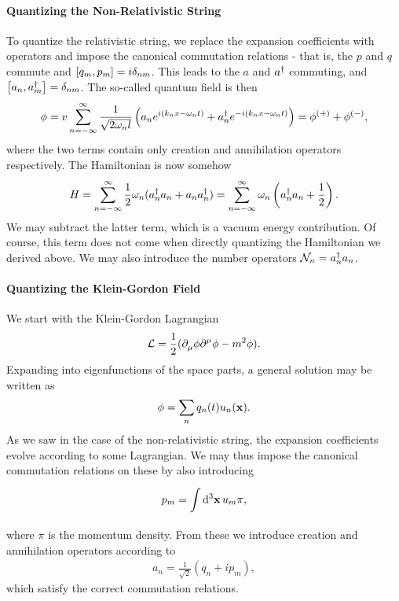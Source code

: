 \paragraph{Quantizing the Non-Relativistic String}
To quantize the relativistic string, we replace the expansion coefficients with operators and impose the canonical commutation relations - that is, the $p$ and $q$ commute and $\comm{q_{m}}{p_{m}} = i\delta_{nm}$. This leads to the $a$ and $a^{\dagger}$ commuting, and $\comm{a_{n}}{a_{m}\adj} = \delta_{nm}$. The so-called quantum field is then
\begin{align*}
	\phi = v\sum\limits_{n = -\infty}^{\infty}\frac{1}{\sqrt{2\omega_{n}l}}\left(a_{n}e^{i(k_{n}x - \omega_{n}t)} + a_{n}^{\dagger} e^{-i(k_{n}x - \omega_{n}t)}\right) = \phi^{(+)} + \phi^{(-)},
\end{align*}
where the two terms contain only creation and annihilation operators respectively. The Hamiltonian is now somehow
\begin{align*}
	H = \sum\limits_{n = -\infty}^{\infty}\frac{1}{2}\omega_{n}(a_{n}^{\dagger} a_{n} + a_{n}a_{n}^{\dagger}) = \sum\limits_{n = -\infty}^{\infty}\omega_{n}\left(a_{n}^{\dagger} a_{n} + \frac{1}{2}\right).
\end{align*}
We may subtract the latter term, which is a vacuum energy contribution. Of course, this term does not come when directly quantizing the Hamiltonian we derived above. We may also introduce the number operators $\mathcal{N}_{n} = a_{n}^{\dagger} a_{n}$.

\paragraph{Quantizing the Klein-Gordon Field}
We start with the Klein-Gordon Lagrangian
\begin{align*}
	\mathcal{L} = \frac{1}{2}(\partial^{}_{\mu}{\phi}\partial^{\mu}_{}{\phi} - m^{2}\phi).
\end{align*}
Expanding into eigenfunctions of the space parts, a general solution may be written as
\begin{align*}
	\phi = \sum\limits_{n}q_{n}(t)u_{n}(\vb{x}).
\end{align*}
As we saw in the case of the non-relativistic string, the expansion coefficients evolve according to some Lagrangian. We may thus impose the canonical commutation relations on these by also introducing
\begin{align*}
	p_{m} = \int\limits_{}^{}\dd[3]{\vb{x}}u_{m}\pi,
\end{align*}
where $\pi$ is the momentum density. From these we introduce creation and annihilation operators according to
\begin{align*}
	a_{n} = \frac{1}{\sqrt{2}}(q_{n} + ip_{m}),
\end{align*}
which satisfy the correct commutation relations.

